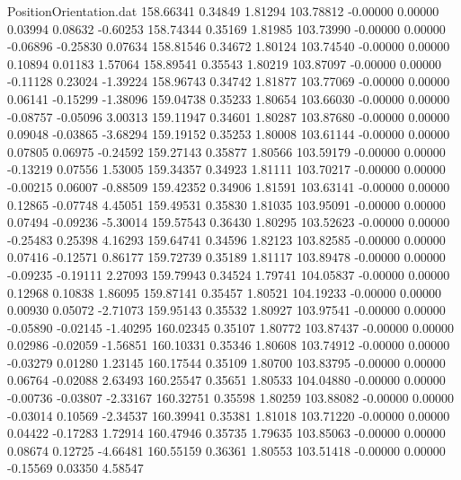 \begin{filecontents}{PositionOrientation.dat}
 158.66341    0.34849    1.81294   103.78812   -0.00000    0.00000    0.03994    0.08632   -0.60253
 158.74344    0.35169    1.81985   103.73990   -0.00000    0.00000   -0.06896   -0.25830    0.07634
 158.81546    0.34672    1.80124   103.74540   -0.00000    0.00000    0.10894    0.01183    1.57064
 158.89541    0.35543    1.80219   103.87097   -0.00000    0.00000   -0.11128    0.23024   -1.39224
 158.96743    0.34742    1.81877   103.77069   -0.00000    0.00000    0.06141   -0.15299   -1.38096
 159.04738    0.35233    1.80654   103.66030   -0.00000    0.00000   -0.08757   -0.05096    3.00313
 159.11947    0.34601    1.80287   103.87680   -0.00000    0.00000    0.09048   -0.03865   -3.68294
 159.19152    0.35253    1.80008   103.61144   -0.00000    0.00000    0.07805    0.06975   -0.24592
 159.27143    0.35877    1.80566   103.59179   -0.00000    0.00000   -0.13219    0.07556    1.53005
 159.34357    0.34923    1.81111   103.70217   -0.00000    0.00000   -0.00215    0.06007   -0.88509
 159.42352    0.34906    1.81591   103.63141   -0.00000    0.00000    0.12865   -0.07748    4.45051
 159.49531    0.35830    1.81035   103.95091   -0.00000    0.00000    0.07494   -0.09236   -5.30014
 159.57543    0.36430    1.80295   103.52623   -0.00000    0.00000   -0.25483    0.25398    4.16293
 159.64741    0.34596    1.82123   103.82585   -0.00000    0.00000    0.07416   -0.12571    0.86177
 159.72739    0.35189    1.81117   103.89478   -0.00000    0.00000   -0.09235   -0.19111    2.27093
 159.79943    0.34524    1.79741   104.05837   -0.00000    0.00000    0.12968    0.10838    1.86095
 159.87141    0.35457    1.80521   104.19233   -0.00000    0.00000    0.00930    0.05072   -2.71073
 159.95143    0.35532    1.80927   103.97541   -0.00000    0.00000   -0.05890   -0.02145   -1.40295
 160.02345    0.35107    1.80772   103.87437   -0.00000    0.00000    0.02986   -0.02059   -1.56851
 160.10331    0.35346    1.80608   103.74912   -0.00000    0.00000   -0.03279    0.01280    1.23145
 160.17544    0.35109    1.80700   103.83795   -0.00000    0.00000    0.06764   -0.02088    2.63493
 160.25547    0.35651    1.80533   104.04880   -0.00000    0.00000   -0.00736   -0.03807   -2.33167
 160.32751    0.35598    1.80259   103.88082   -0.00000    0.00000   -0.03014    0.10569   -2.34537
 160.39941    0.35381    1.81018   103.71220   -0.00000    0.00000    0.04422   -0.17283    1.72914
 160.47946    0.35735    1.79635   103.85063   -0.00000    0.00000    0.08674    0.12725   -4.66481
 160.55159    0.36361    1.80553   103.51418   -0.00000    0.00000   -0.15569    0.03350    4.58547

\end{filecontents}

